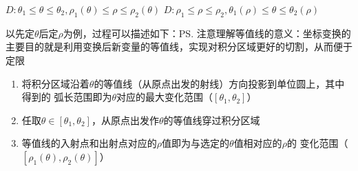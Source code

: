 \begin{center}
	\hspace{2cm}
	
	$D:\theta_1\leq\theta\leq\theta_2,\rho_1(\theta)\leq\rho\leq\rho_2(\theta)$
	\hspace{2cm}
	$D:\rho_1\leq\rho\leq\rho_2,\theta_1(\rho)\leq\theta\leq\theta_2(\rho)$
\end{center}

以先定$\theta$后定$\rho$为例，过程可以描述如下：\ps{注意理解等值线的意义：坐标变换的
主要目的就是利用变换后新变量的等值线，实现对积分区域更好的切割，从而便于定限}
\begin{enumerate}[Step-1:]
  \setlength{\itemindent}{1cm}
  \item 将积分区域沿着$\theta$的等值线（从原点出发的射线）方向投影到单位圆上，其中得到的
  弧长范围即为$\theta$对应的最大变化范围（$[\theta_1,\theta_2]$）
  \item 任取$\theta\in[\theta_1,\theta_2]$，从原点出发作$\theta$的等值线穿过积分区域
  \item 等值线的入射点和出射点对应的$\rho$值即为与选定的$\theta$值相对应的$\rho$的
  变化范围（$[\rho_1(\theta),\rho_2(\theta)]$）
\end{enumerate}

